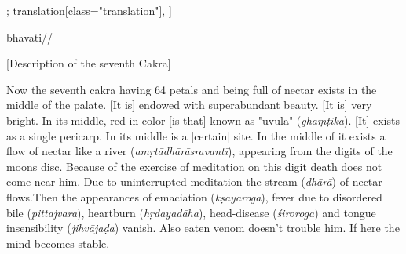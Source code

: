 \documentclass[12pt]{article}%
\begin{document}
\begin{alignment}[
    texts=edition[class="edition"];
    translation[class="translation"],
  ]
\begin{edition}
\begin{prose}
         bhavati//         
    \end{prose}
\end{edition}
\begin{translation}
    \bigskip
    \centerline{\textrm{\small{[Description of the seventh Cakra]}}}
    \bigskip
  \begin{tlate}
    Now the seventh cakra having 64 petals and being full of nectar exists in the middle of the palate.    
%
%
%
[It is] endowed with superabundant beauty. [It is] very bright. In its middle, red in color [is that] known as "uvula" (\textit{ghāṃṭikā}). [It] exists as a single pericarp. In its middle is a [certain] site. In the middle of it exists a flow of nectar like a river (\textit{amṛtādhārāsravantī}), appearing from the digits of the moons disc. Because of the exercise of meditation on this digit death does not come near him. Due to uninterrupted meditation the stream (\textit{dhārā}) of nectar flows.Then the appearances of emaciation (\textit{kṣayaroga}), fever due to disordered bile (\textit{pittajvara}), heartburn (\textit{hṛdayadāha}), head-disease (\textit{śiroroga}) and tongue insensibility (\textit{jihvājaḍa}) vanish. Also eaten venom doesn't trouble him. If here the mind becomes stable.     
  \end{tlate}
\end{translation}
\end{alignment}
\end{document}
